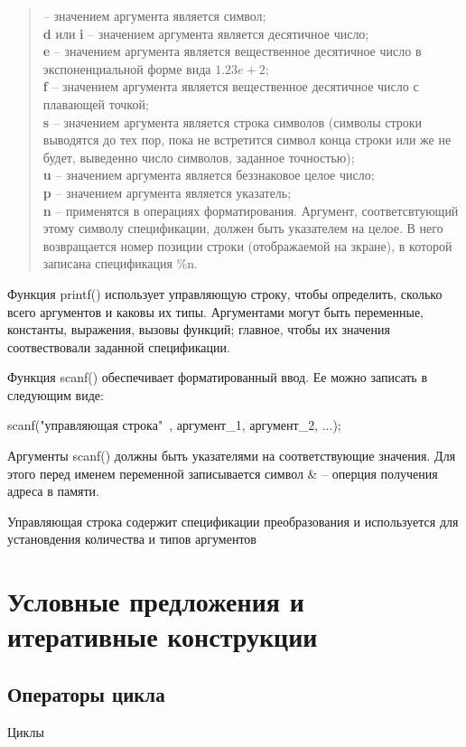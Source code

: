 \documentclass[a4paper, fontsize=10bp]{article} %
\begin{document}
\begin{quotation}
    
     -- значением аргумента является символ;
\\
    {\textbf d} или {\textbf i} -- значением аргумента является десятичное число;
\\
    {\textbf e} -- значением аргумента является вещественное десятичное число в экспоненциальной форме вида
    $1.23e+2$;
\\
    {\textbf f} -- значением аргумента является вещественное десятичное число с плавающей точкой;
\\
    {\textbf s} -- значением аргумента является строка символов (символы строки выводятся до тех пор, пока не 
                    встретится символ конца строки или же не будет, выведенно число символов, заданное точностью);
\\
    {\textbf u} -- значением аргумента является беззнаковое целое число;
\\
    {\textbf p} -- значением аргумента является указатель;
\\
    {\textbf n} -- применятся в операциях форматирования. Аргумент, соответсвтующий этому символу
                    спецификации, должен быть указателем на целое. В него возвращается номер позиции строки
                    (отображаемой на зкране), в которой записана спецификация \%n.

\end{quotation}

Функция printf() использует управляющую строку, чтобы определить, сколько всего аргументов и каковы
их типы. Аргументами могут быть переменные, константы, выражения, вызовы функций; главное, чтобы их
значения соотвествовали заданной спецификации.

\noindent Функция scanf() обеспечивает форматированный ввод. Ее можно записать в следующим виде:

scanf("управляющая строка"\ , аргумент\_1, аргумент\_2, ...);

\noindent Аргументы scanf() должны быть указателями на соответствующие значения. Для этого перед именем
переменной записывается символ \& -- оперция получения адреса в памяти.

\noindent Управляющая строка содержит спецификации преобразования и используется для установдения количества
и типов аргументов


\section{Условные предложения и итеративные конструкции}

\subsection*{Операторы цикла}

\indent Циклы 
\end{document}
